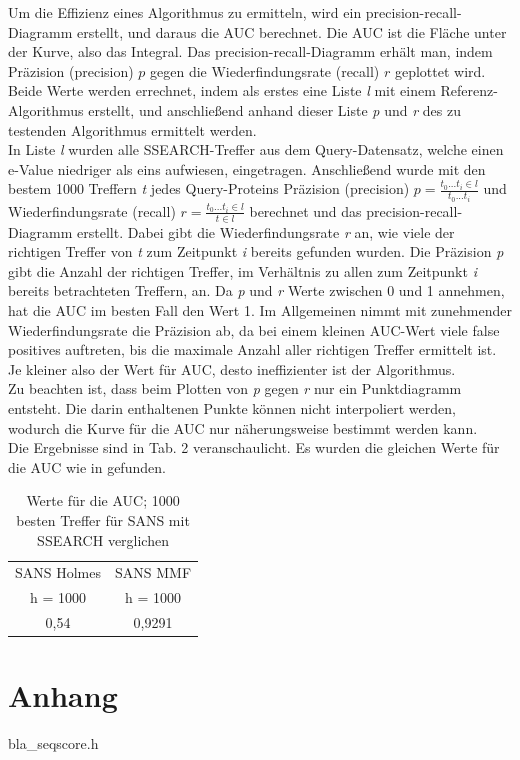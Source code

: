 \documentclass{article}
\begin{document}
Um die Effizienz eines Algorithmus zu ermitteln, wird ein precision-recall-Diagramm erstellt, und daraus die AUC berechnet. Die AUC ist die Fläche unter der Kurve, also das Integral. Das precision-recall-Diagramm erhält man, indem Präzision (precision) $p$ gegen die Wiederfindungsrate (recall) $r$ geplottet wird. Beide Werte werden errechnet, indem als erstes eine Liste \textit l mit einem Referenz-Algorithmus erstellt, und anschließend anhand dieser Liste \textit p und \textit r des zu testenden Algorithmus ermittelt werden.\\In Liste \textit l wurden alle SSEARCH-Treffer aus dem Query-Datensatz, welche einen e-Value niedriger als eins aufwiesen, eingetragen. Anschließend wurde mit den bestem 1000 Treffern \textit t jedes Query-Proteins Präzision (precision) $p = \frac{t_0 ... t_i \in l}{t_0 ... t_i}$ und Wiederfindungsrate (recall) $r = \frac {t_0 ... t_i \in l}{t \in l}$ berechnet und das precision-recall-Diagramm erstellt. Dabei gibt die Wiederfindungsrate \textit r an, wie viele der richtigen Treffer von \textit t zum Zeitpunkt \textit i bereits gefunden wurden. Die Präzision \textit p gibt die Anzahl der richtigen Treffer, im Verhältnis zu allen zum Zeitpunkt \textit i bereits betrachteten Treffern, an. Da \textit p und \textit r Werte zwischen 0 und 1 annehmen, hat die AUC im besten Fall den Wert 1. Im Allgemeinen nimmt mit zunehmender Wiederfindungsrate die Präzision ab, da bei einem kleinen AUC-Wert viele false positives auftreten, bis die maximale Anzahl aller richtigen Treffer ermittelt ist. Je kleiner also der Wert für AUC, desto ineffizienter ist der Algorithmus.\\Zu beachten ist, dass beim Plotten von \textit p gegen \textit r nur ein Punktdiagramm entsteht. Die darin enthaltenen Punkte können nicht interpoliert werden, wodurch die Kurve für die AUC nur näherungsweise bestimmt werden kann.\\Die Ergebnisse sind in Tab. 2 veranschaulicht. Es wurden die gleichen Werte für die AUC wie in \cite{Holm} gefunden.

  \begin{table}[h]
  \centering
    \caption{Werte für die AUC; 1000 besten Treffer für SANS mit SSEARCH verglichen}
    \begin{tabular}{cc}
      \hline
      SANS Holmes & SANS MMF\\
      h = 1000 & h = 1000\\
      \hline
      0,54 & 0,9291\\
      \hline
    \end{tabular}
  \end{table}

\section{Anhang}

bla\_seqscore.h

{}

\end{document}
